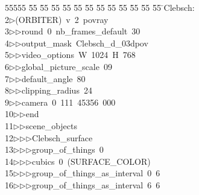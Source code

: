 %
%
\begin{tabbing}
55555 \= 55 \= 55 \= 55 \= 55 \= 55 \= 55 \= 55 \= 55 \= 55 \= 55 \= 55 \= 55 \= \>Clebsch:\\[0pt]
2\>$\triangleright$\>(ORBITER)\ v\ 2\ povray\ \\[0pt]
3\>$\triangleright$\>$\triangleright$\>round\ 0\ nb\_frames\_default\ 30\ \\[0pt]
4\>$\triangleright$\>$\triangleright$\>output\_mask\ Clebsch\_d\_03dpov\ \\[0pt]
5\>$\triangleright$\>$\triangleright$\>video\_options\ W\ 1024\ H\ 768\ \\[0pt]
6\>$\triangleright$\>$\triangleright$\>global\_picture\_scale\ 09\ \\[0pt]
7\>$\triangleright$\>$\triangleright$\>default\_angle\ 80\ \\[0pt]
8\>$\triangleright$\>$\triangleright$\>clipping\_radius\ 24\ \\[0pt]
9\>$\triangleright$\>$\triangleright$\>camera\ 0\ 111\ 45356\ 000\ \\[0pt]
10\>$\triangleright$\>$\triangleright$\>end\ \\[0pt]
11\>$\triangleright$\>$\triangleright$\>scene\_objects\ \\[0pt]
12\>$\triangleright$\>$\triangleright$\>$\triangleright$\>Clebsch\_surface\ \\[0pt]
13\>$\triangleright$\>$\triangleright$\>$\triangleright$\>group\_of\_things\ 0\ \\[0pt]
14\>$\triangleright$\>$\triangleright$\>$\triangleright$\>cubics\ 0\ (SURFACE\_COLOR)\ \\[0pt]
15\>$\triangleright$\>$\triangleright$\>$\triangleright$\>group\_of\_things\_as\_interval\ 0\ 6\ \\[0pt]
16\>$\triangleright$\>$\triangleright$\>$\triangleright$\>group\_of\_things\_as\_interval\ 6\ 6\ \\[0pt]

\end{tabbing}
